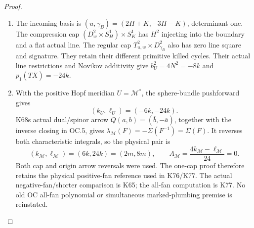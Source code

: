 \begin{proof}
\begin{enumerate}[label=\arabic*.]
\item The incoming basis is \((u,\gamma_B)=(2H+K,-3H-K)\), determinant
one. The compression cap \((D_w^2\times S_H^1)\times S_K^1\)
has \(H^2\) injecting into the boundary and a flat actual line.
The regular cap \(T^2_{u,w}\times D^2_{\gamma_B}\) also has zero
line square and signature. They retain their different primitive
killed cycles. Their actual line restrictions and Novikov
additivity give \(b_U^2=4N^2=-8k\) and
\(p_1(T\overline X)=-24k\).

\item With the positive Hopf meridian \(U=\mathcal M^*\), the
sphere-bundle pushforward gives
\[
(k_U,\ell_U)=(-6k,-24k).
\]
K68\textquotesingle s actual dual/spinor arrow
\(Q(a,b)=(\overline b,-\overline a)\), together with the inverse
closing in OC.5, gives
\(\lambda_{\mathcal M}(F)=-\Sigma(F^{-1})=\Sigma(F)\).
It reverses both characteristic integrals, so the physical pair is
\[
(k_{\mathcal M},\ell_{\mathcal M})=(6k,24k)=(2m,8m),\qquad
A_{\mathcal M}=\frac{4k_{\mathcal M}-\ell_{\mathcal M}}{24}=0.
\tag{OC.22}
\]
Both cap and origin arrow reversals were used. The one-cap proof
therefore retains the physical positive-fan reference used in
K76/K77. The actual negative-fan/shorter comparison is K65; the
all-fan computation is K77. No old OC all-fan polynomial or
simultaneous marked-plumbing premise is reinstated.

\end{enumerate}
\end{proof}